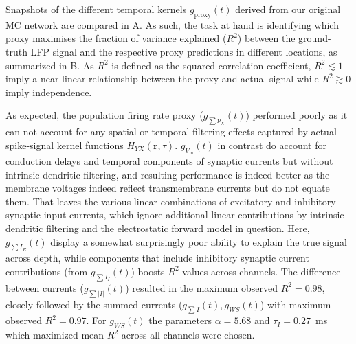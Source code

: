 Snapshots of the different temporal kernels $g_\mathrm{proxy}(t)$ derived from our original MC network are compared in A.  
As such, the task at hand is identifying which proxy maximises the fraction of variance explained ($R^2$) between the  ground-truth LFP signal and the respective proxy predictions in different locations, 
as summarized in B. 
As $R^2$ is defined as the squared correlation coefficient, $R^2 \lesssim 1$ imply a near linear relationship between the proxy and actual signal while $R^2 \gtrsim 0$ imply independence.

As expected, the population firing rate proxy ($g_{\sum \nu_X}(t)$) performed poorly as it can not account for any spatial or temporal filtering effects captured by actual spike-signal kernel functions $H_{YX}(\mathbf{r}, \tau)$. 
$g_{V_\mathrm{m}}(t)$ in contrast do account for conduction delays and
temporal components of synaptic currents but without intrinsic dendritic filtering, 
and resulting performance is indeed better as the membrane voltages indeed reflect transmembrane currents but do not equate them. 
That leaves the various linear combinations of excitatory and inhibitory synaptic input currents, 
which ignore additional linear contributions by intrinsic dendritic filtering and the electrostatic forward model in question. 
Here, $g_{\sum I_E}(t)$ display a somewhat surprisingly poor ability to explain the true signal across depth, 
while components that include inhibitory synaptic current contributions (from $g_{\sum I_I}(t)$) boosts $R^2$ values across channels. 
The difference between currents ($g_{\sum {|I|}}(t)$) resulted in the maximum observed $R^2 = 0.98$, 
closely followed by the summed currents ($g_{\sum {I}}(t), g_{WS}(t)$) with maximum observed $R^2 = 0.97$.
For $g_{WS}(t)$ the parameters $\alpha=5.68$ and $\tau_I=0.27$~\si{\milli\second} which maximized mean $R^2$ across all channels were chosen.

